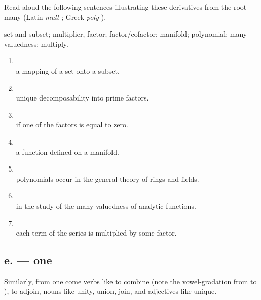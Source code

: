 \begin{keybox}[Exercise 5.10]
Read aloud the following sentences illustrating these derivatives from the root  many (Latin \emph{mult-}; Greek \emph{poly-}).
\end{keybox}

\noindent{} set and  subset;  multiplier, factor;  factor/cofactor;  manifold;  polynomial;  many-valuedness;  multiply.

\begin{enumerate}[label=\arabic*)]
\item {}\\
      a mapping of a set onto a subset.
\item {}\\
      unique decomposability into prime factors.
\item {}\\
      if one of the factors is equal to zero.
\item {}\\
      a function defined on a manifold.
\item {}\\
      polynomials occur in the general theory of rings and fields.
\item {}\\
      in the study of the many-valuedness of analytic functions.
\item {}\\
      each term of the series is multiplied by some factor.
\end{enumerate}

\subsection*{e.  --- one}

Similarly, from  one come verbs like  to combine (note the vowel-gradation from  to ),  to adjoin, nouns like  unity,  union, join, and adjectives like  unique.

